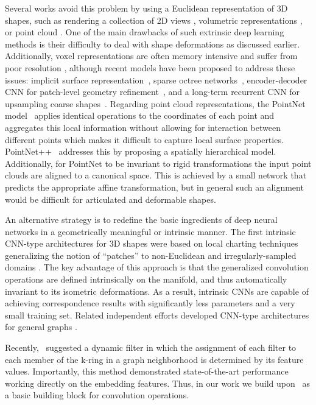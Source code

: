 \documentclass[10pt,twocolumn,letterpaper]{article}
\begin{document}
Several works avoid this problem by using a Euclidean representation of 3D shapes, such as rendering a collection of 2D views \cite{su2015multi,wei2016dense}, volumetric representations \cite{wu20153d}, or point cloud \cite{qi2016pointnet,qi2017pointnet++}. One of the main drawbacks of such extrinsic deep learning methods is their difficulty to deal with shape deformations as discussed earlier. Additionally, voxel representations are often memory intensive and suffer from poor resolution \cite{wu20153d}, although recent models have been proposed to address these issues: implicit surface representation~\cite{dai2016shape}, sparse octree networks~\cite{wang17ocnn,riegler17cvpr}, encoder-decoder CNN for patch-level geometry refinement~\cite{han17iccv}, and a long-term recurrent CNN for upsampling coarse shapes~\cite{wang17iccv}. Regarding point cloud representations, the PointNet model~\cite{qi2016pointnet} applies identical operations to the coordinates of each point and aggregates this local information without allowing for interaction between different points which makes it difficult to capture local surface properties. PointNet++~\cite{qi2017pointnet++} addresses this by proposing a spatially hierarchical model. Additionally, for PointNet to be invariant to rigid transformations the input point clouds are aligned to a canonical space. This is achieved by a small network that predicts the appropriate affine transformation, but in general such an alignment would be difficult for articulated and deformable shapes.

An alternative strategy is to redefine the basic ingredients of deep neural networks in a geometrically meaningful or intrinsic manner. The first intrinsic CNN-type architectures for 3D shapes were based on local charting techniques generalizing the notion of ``patches'' to non-Euclidean and irregularly-sampled domains \cite{masci15,boscaini2016learning,monet}. The key advantage of this approach is that the generalized convolution operations are defined intrinsically on the manifold, and thus automatically invariant to its isometric deformations. As a result, intrinsic CNNs are capable of achieving correspondence results with significantly less parameters and a very small training set. Related independent efforts developed CNN-type architectures for general graphs \cite{bruna2013spectral,henaff2015deep,defferrard2016convolutional,kipf2016semi,monet,levie2017cayleynets}. 

Recently,~\cite{dynFilt} suggested a dynamic filter in which the assignment of each filter to each member of the k-ring in a graph neighborhood is determined by its feature values. Importantly, this method demonstrated state-of-the-art performance working directly on the embedding features. Thus, in our work we build upon~\cite{dynFilt} as a basic building block for convolution operations. 
\end{document}
